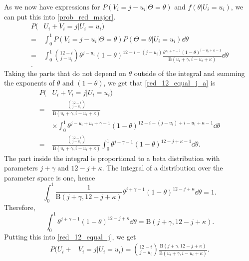 As we now have expressions for $P(V_i=j-u_i|\Theta=\theta)$ and $f(\theta|U_i=u_i)$, we can put this into \eqref{prob_red_major}.
\begin{equation}
\label{red_12_equal_j_a}
    \begin{aligned}
         P(&U_i+V_i = j | U_i=u_i) \\[6pt]
        =& \int_0^1 P(V_i = j-u_i | \Theta=\theta) P(\Theta=\theta| U_i=u_i) \dd \theta \\[6pt]
        =& \int_0^1 \binom{12-i}{j-u_i}\theta^{j-u_i}(1-\theta)^{12-i-(j-u_i)} \frac{\theta^{u_i+\gamma-1}(1-\theta)^{i-u_i+\kappa-1}}{\text{B}(u_i+\gamma,i-u_i+\kappa)} \dd \theta\\[6pt].
    \end{aligned}
\end{equation}
Taking the parts that do not depend on $\theta$ outside of the integral and summing the exponents of $\theta$ and $(1-\theta)$, we get that \eqref{red_12_equal_j_a} is
\begin{equation}
\label{red_12_equal_j}
    \begin{aligned}
         P(&U_i+V_i = j | U_i=u_i) \\[6pt]
        =& \frac{\binom{12-i}{j-u_i}}{\text{B}(u_i+\gamma,i-u_i+\kappa)} \\[6pt]
        &\times \int_0^1 
        \theta^{j-u_i+u_i+\gamma-1}(1-\theta)^{12-i-(j-u_i)+i-u_i+\kappa-1} \dd \theta\\[6pt]
        =& \frac{\binom{12-i}{j-u_i}}{\text{B}(u_i+\gamma,i-u_i+\kappa)} \int_0^1 
        \theta^{j+\gamma-1}(1-\theta)^{12-j+\kappa-1} \dd \theta.
    \end{aligned}
\end{equation}
The part inside the integral is proportional to a beta distribution with parameters $j+\gamma$ and $12-j+\kappa$. The integral of a distribution over the parameter space is one, hence
\begin{equation*}
    \int_0^1 \frac{1}{\text{B}(j+\gamma,12-j+\kappa)}\theta^{j+\gamma-1}(1-\theta)^{12-j+\kappa} \dd \theta = 1.
\end{equation*}
Therefore,
\begin{equation*}
    \int_0^1 \theta^{j+\gamma-1}(1-\theta)^{12-j+\kappa} \dd \theta = \text{B}(j+\gamma,12-j+\kappa).
\end{equation*}
Putting this into \eqref{red_12_equal_j}, we get
\begin{equation}
\label{red_12_equal_j_final}
    \begin{aligned}
        P(U_i+&V_i = j | U_i=u_i) = \binom{12-i}{j-u_i} \frac{\text{B}(j+\gamma,12-j+\kappa)}{\text{B}(u_i+\gamma,i-u_i+\kappa)}.
    \end{aligned}
\end{equation}

